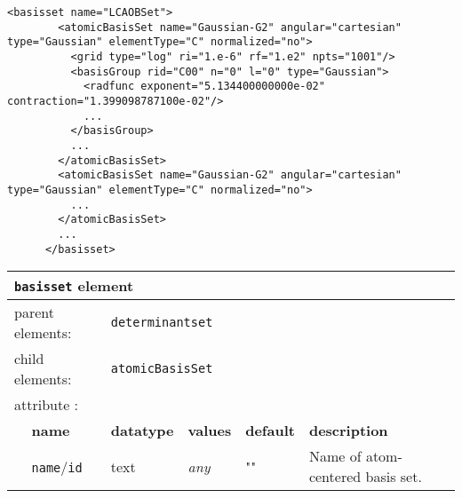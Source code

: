 \begin{minipage}{\linewidth}
\begin{lstlisting}[caption=Basic input block for \texttt{basisset}.]
      <basisset name="LCAOBSet">
        <atomicBasisSet name="Gaussian-G2" angular="cartesian" type="Gaussian" elementType="C" normalized="no">
          <grid type="log" ri="1.e-6" rf="1.e2" npts="1001"/>
          <basisGroup rid="C00" n="0" l="0" type="Gaussian">
            <radfunc exponent="5.134400000000e-02" contraction="1.399098787100e-02"/>
            ...
          </basisGroup>
          ...              
        </atomicBasisSet>
        <atomicBasisSet name="Gaussian-G2" angular="cartesian" type="Gaussian" elementType="C" normalized="no">
          ...              
        </atomicBasisSet>
        ...
      </basisset>
\end{lstlisting}
\end{minipage}

\begin{table}[h]
\begin{center}
\begin{tabularx}{\textwidth}{l l l l l l }
\hline
\multicolumn{6}{l}{\texttt{basisset} element} \\
\hline
\multicolumn{2}{l}{parent elements:} & \multicolumn{4}{l}{\texttt{determinantset}}\\
\multicolumn{2}{l}{child  elements:} & \multicolumn{4}{l}{\texttt{atomicBasisSet}}\\
\multicolumn{2}{l}{attribute      :} & \multicolumn{4}{l}{}\\
   &   \bfseries name              & \bfseries datatype & \bfseries values & \bfseries default   & \bfseries description \\
   &   \texttt{name}/\texttt{id}   &  text              &  \textit{any}    &  ""                & Name of atom-centered basis set. \\
  \hline
\end{tabularx}
\end{center}
\end{table}

